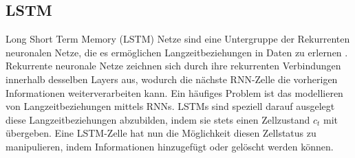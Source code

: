 \subsection{LSTM}
Long Short Term Memory (LSTM) Netze sind eine Untergruppe der Rekurrenten neuronalen Netze, die es ermöglichen Langzeitbeziehungen in Daten zu erlernen \citep{lstm}.
Rekurrente neuronale Netze zeichnen sich durch ihre rekurrenten Verbindungen innerhalb desselben Layers aus, wodurch die nächste RNN-Zelle die vorherigen Informationen weiterverarbeiten kann.
Ein häufiges Problem ist das modellieren von Langzeitbeziehungen mittels RNNs. 
LSTMs sind speziell darauf ausgelegt diese Langzeitbeziehungen abzubilden, indem sie stets einen Zellzustand $c_t$ mit übergeben.
Eine LSTM-Zelle hat nun die Möglichkeit diesen Zellstatus zu manipulieren, indem Informationen hinzugefügt oder gelöscht werden können.



\pagebreak
